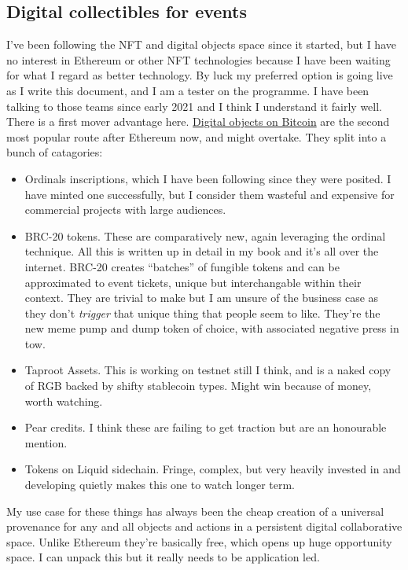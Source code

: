 \subsection{Digital collectibles for events}
I've been following the NFT and digital objects space since it started, but I have no interest in Ethereum or other NFT technologies because I have been waiting for what I regard as better technology. By luck my preferred option is going live as I write this document, and I am a tester on the programme. I have been talking to those teams since early 2021 and I think I understand it fairly well. There is a first mover advantage here. \href{https://coinmarketcap.com/alexandria/article/bitcoin-is-now-the-second-most-popular-blockchain-for-nfts}{Digital objects on Bitcoin} are the second most popular route after Ethereum now, and might overtake. They split into a bunch of catagories:
\begin{itemize}
\item Ordinals inscriptions, which I have been following since they were posited. I have minted one successfully, but I consider them wasteful and expensive for commercial projects with large audiences.
\item BRC-20 tokens. These are comparatively new, again leveraging the ordinal technique. All this is written up in detail in my book and it's all over the internet. BRC-20 creates ``batches'' of fungible tokens and can be approximated to event tickets, unique but interchangable within their context. They are trivial to make but I am unsure of the business case as they don't \textit{trigger} that unique thing that people seem to like. They're the new meme pump and dump token of choice, with associated negative press in tow.
\item Taproot Assets. This is working on testnet still I think, and is a naked copy of RGB backed by shifty stablecoin types. Might win because of money, worth watching.
\item Pear credits. I think these are failing to get traction but are an honourable mention.
\item Tokens on Liquid sidechain. Fringe, complex, but very heavily invested in and developing quietly makes this one to watch longer term.
\end{itemize}
My use case for these things has always been the cheap creation of a universal provenance for any and all objects and actions in a persistent digital collaborative space. Unlike Ethereum they're basically free, which opens up huge opportunity space. I can unpack this but it really needs to be application led.
